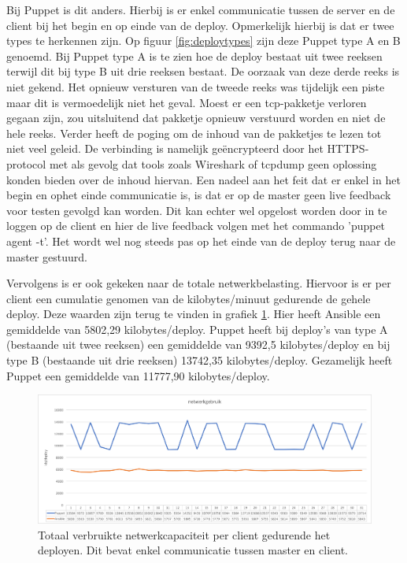 Bij Puppet is dit anders. Hierbij is er enkel communicatie tussen de server en de client bij het begin en op einde van de deploy. Opmerkelijk hierbij is dat er twee types te herkennen zijn. Op figuur \ref{fig:deploytypes} zijn deze Puppet type A en B genoemd. Bij Puppet type A is te zien hoe de deploy bestaat uit twee reeksen terwijl dit bij type B uit drie reeksen bestaat. De oorzaak van deze derde reeks is niet gekend. Het opnieuw versturen van de tweede reeks was tijdelijk een piste maar dit is vermoedelijk niet het geval. Moest er een tcp-pakketje verloren gegaan zijn, zou uitsluitend dat pakketje opnieuw verstuurd worden en niet de hele reeks. Verder heeft de poging om de inhoud van de pakketjes te lezen tot niet veel geleid. De verbinding is namelijk ge\"encrypteerd door het HTTPS-protocol met als gevolg dat tools zoals Wireshark of tcpdump geen oplossing konden bieden over de inhoud hiervan.\newline
Een nadeel aan het feit dat er enkel in het begin en ophet einde communicatie is, is dat er op de master geen live feedback voor testen gevolgd kan worden. Dit kan echter wel opgelost worden door in te loggen op de client en hier de live feedback volgen met het commando 'puppet agent -t'. Het wordt wel nog steeds pas op het einde van de deploy terug naar de master gestuurd.
 \newline


Vervolgens is er ook gekeken naar de totale netwerkbelasting. Hiervoor is er per client een cumulatie genomen van de kilobytes/minuut gedurende de gehele deploy. Deze waarden zijn terug te vinden in grafiek \ref{fig:netwerkverbruik}. Hier heeft Ansible een gemiddelde van 5802,29 kilobytes/deploy. Puppet heeft bij deploy's van type A (bestaande uit twee reeksen) een gemiddelde van  9392,5 kilobytes/deploy en bij type B (bestaande uit drie reeksen) 13742,35 kilobytes/deploy. Gezamelijk heeft Puppet een gemiddelde van 11777,90 kilobytes/deploy. 


\begin{figure}
  \includegraphics[width=\linewidth]{img/netwerkverbruik.png}
 \caption{Totaal verbruikte netwerkcapaciteit per client gedurende het deployen. Dit bevat enkel communicatie tussen master en client.}  
  \label{fig:netwerkverbruik}
\end{figure}


